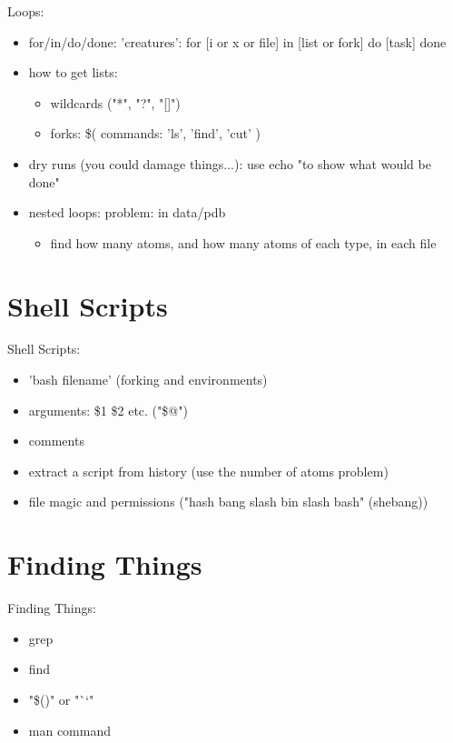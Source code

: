 \documentclass[
 size=12pt,
 paper=screen,
 mode=present,
 display=slidesnotes,
 style=paintings,
 nohandoutpagebreaks,
]{powerdot}
\begin{document}
\begin{slide}{Loops:}
  \begin{itemize}
    \begingroup
    \fontsize{8}{8}\selectfont
     \item for/in/do/done: 'creatures': for [i or x or file] in [list or fork] do [task] done
     \item how to get lists:
     \begin{itemize}
        \item wildcards ("*", "?", "[]")
	\item forks: \$( commands: 'ls', 'find', 'cut' )
     \end{itemize}
     \item dry runs (you could damage things...): use echo "to show what would be done"
     \item nested loops: problem: in data/pdb
     \begin{itemize}
        \item find how many atoms, and how many atoms of each type, in each file
     \end{itemize}
    \endgroup
  \end{itemize}
\end{slide}

\section[slide=false]{Shell Scripts}

\begin{slide}{Shell Scripts:}
  \begin{itemize}
     \item 'bash filename' (forking and environments)
     \item arguments: \$1 \$2 etc. ("\$@")
     \item comments
     \item extract a script from history (use the number of atoms problem)
     \item file magic and permissions ("hash bang slash bin slash bash" (shebang))
  \end{itemize}
\end{slide}

\section[slide=false]{Finding Things}

\begin{slide}{Finding Things:}
  \begin{itemize}
     \item grep
     \item find
     \item "\$()" or "``"
     \item man command
  \end{itemize}
\end{slide}
\end{document}
